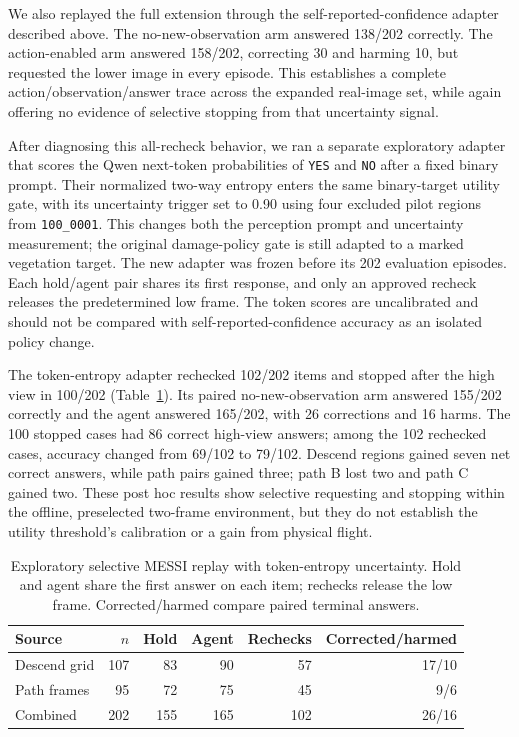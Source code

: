 We also replayed the full extension through the self-reported-confidence adapter described above. The no-new-observation arm answered 138/202 correctly. The action-enabled arm answered 158/202, correcting 30 and harming 10, but requested the lower image in every episode. This establishes a complete action/observation/answer trace across the expanded real-image set, while again offering no evidence of selective stopping from that uncertainty signal.

After diagnosing this all-recheck behavior, we ran a separate exploratory adapter that scores the Qwen next-token probabilities of \texttt{YES} and \texttt{NO} after a fixed binary prompt. Their normalized two-way entropy enters the same binary-target utility gate, with its uncertainty trigger set to 0.90 using four excluded pilot regions from \texttt{100\_0001}. This changes both the perception prompt and uncertainty measurement; the original damage-policy gate is still adapted to a marked vegetation target. The new adapter was frozen before its 202 evaluation episodes. Each hold/agent pair shares its first response, and only an approved recheck releases the predetermined low frame. The token scores are uncalibrated and should not be compared with self-reported-confidence accuracy as an isolated policy change.

The token-entropy adapter rechecked 102/202 items and stopped after the high view in 100/202 (Table~\ref{tab:messi-expanded-replay}). Its paired no-new-observation arm answered 155/202 correctly and the agent answered 165/202, with 26 corrections and 16 harms. The 100 stopped cases had 86 correct high-view answers; among the 102 rechecked cases, accuracy changed from 69/102 to 79/102. Descend regions gained seven net correct answers, while path pairs gained three; path B lost two and path C gained two. These post hoc results show selective requesting and stopping within the offline, preselected two-frame environment, but they do not establish the utility threshold's calibration or a gain from physical flight.

\begin{table}[htbp]
\centering\small
\caption{Exploratory selective MESSI replay with token-entropy uncertainty. Hold and agent share the first answer on each item; rechecks release the low frame. Corrected/harmed compare paired terminal answers.}
\label{tab:messi-expanded-replay}
\begin{tabular}{lrrrrr}
\toprule
Source & $n$ & Hold & Agent & Rechecks & Corrected/harmed\\
\midrule
Descend grid & 107 & 83 & 90 & 57 & 17/10\\
Path frames & 95 & 72 & 75 & 45 & 9/6\\
Combined & 202 & 155 & 165 & 102 & 26/16\\
\bottomrule
\end{tabular}
\end{table}

